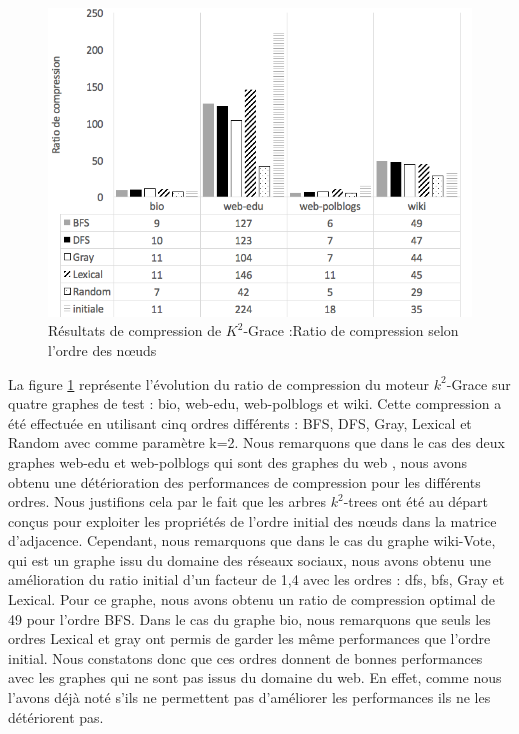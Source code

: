 \begin{figure}[H]
	\centering
	\includegraphics[scale=0.65]{ressources/image/Tests/k2-ordre.png}
	\caption{Résultats de compression de $K^2$-Grace :Ratio de compression selon l'ordre des nœuds}
	\label{fig:K2-ordre }
\end{figure}		

La figure \ref{fig:K2-ordre } représente l'évolution du ratio de compression du moteur $k^2$-Grace sur quatre graphes de test : bio, web-edu, web-polblogs et wiki. Cette compression a été effectuée en utilisant cinq ordres différents : BFS, DFS, Gray, Lexical et Random avec comme paramètre k=2. Nous remarquons que dans le cas des deux graphes web-edu et web-polblogs qui sont des graphes du web , nous avons obtenu une détérioration des performances de compression pour les différents ordres. Nous justifions cela par le fait que les arbres $k^2$-trees ont été au départ conçus pour exploiter les propriétés de l'ordre initial des nœuds dans la matrice d'adjacence. Cependant, nous remarquons que dans le cas du graphe wiki-Vote, qui est un graphe issu du domaine des réseaux sociaux, nous avons obtenu une amélioration du ratio initial d'un facteur de 1,4 avec les ordres : \gls{dfs}, \gls{bfs}, Gray et Lexical. Pour ce graphe, nous avons obtenu un ratio de compression optimal de 49 pour l'ordre BFS. Dans le cas du graphe bio, nous remarquons que seuls les ordres Lexical et gray ont permis de garder les même performances que l'ordre initial. Nous constatons donc que ces ordres donnent de bonnes performances avec les graphes qui ne sont pas issus du domaine du web. En effet, comme nous l'avons déjà noté s'ils ne permettent pas d'améliorer les performances ils ne les détériorent pas.


